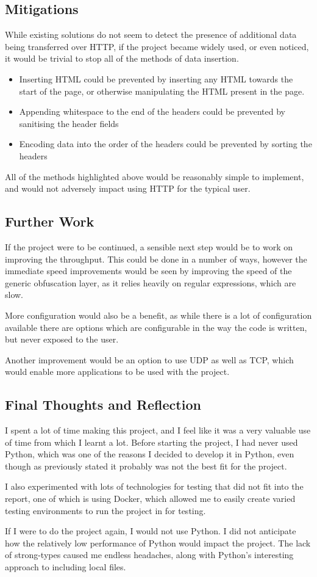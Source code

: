\subsection{Mitigations}
While existing solutions do not seem to detect the presence of additional data being transferred over HTTP, if the project became widely used, or even noticed, it would be trivial to stop all of the methods of data insertion.\par
\begin{itemize}
    \item Inserting HTML could be prevented by inserting any HTML towards the start of the page, or otherwise manipulating the HTML present in the page.
    \item Appending whitespace to the end of the headers could be prevented by sanitising the header fields
    \item Encoding data into the order of the headers could be prevented by sorting the headers
\end{itemize}
All of the methods highlighted above would be reasonably simple to implement, and would not adversely impact using HTTP for the typical user.





\subsection{Further Work}
If the project were to be continued, a sensible next step would be to work on improving the throughput. This could be done in a number of ways, however the immediate speed improvements would be seen by improving the speed of the generic obfuscation layer, as it relies heavily on regular expressions, which are slow.\par
More configuration would also be a benefit, as while there is a lot of configuration available there are options which are configurable in the way the code is written, but never exposed to the user.\par
Another improvement would be an option to use UDP as well as TCP, which would enable more applications to be used with the project.
\subsection{Final Thoughts and Reflection}
I spent a lot of time making this project, and I feel like it was a very valuable use of time from which I learnt a lot. Before starting the project, I had never used Python, which was one of the reasons I decided to develop it in Python, even though as previously stated it probably was not the best fit for the project.\par
I also experimented with lots of technologies for testing that did not fit into the report, one of which is using Docker, which allowed me to easily create varied testing environments to run the project in for testing.\par
If I were to do the project again, I would not use Python. I did not anticipate how the relatively low performance of Python would impact the project. The lack of strong-types caused me endless headaches, along with Python's interesting approach to including local files.
